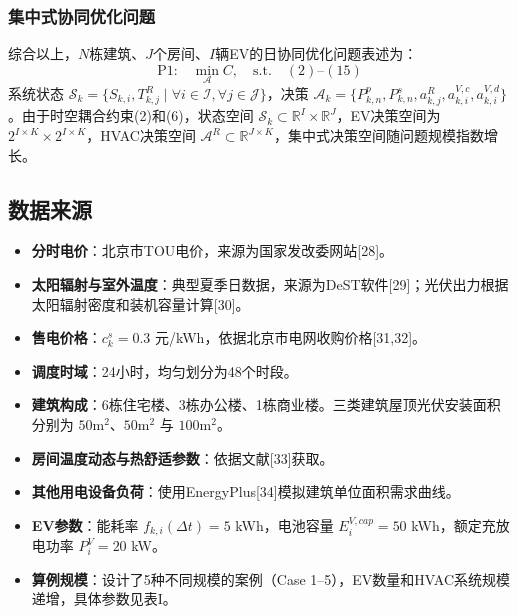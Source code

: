 \documentclass[11pt]{ctexart}
\begin{document}
\subsubsection{集中式协同优化问题}
综合以上，$N$栋建筑、$J$个房间、$I$辆EV的日协同优化问题表述为：
\begin{equation}
    \text{P1:} \quad \min_{\mathcal{A}} C, \quad \text{s.t.} \quad (2)\text{--}(15)
\end{equation}
系统状态 $\mathcal{S}_k = \{S_{k,i}, T_{k,j}^R \mid \forall i \in \mathcal{I}, \forall j \in \mathcal{J}\}$，决策 $\mathcal{A}_k = \{P_{k,n}^p, P_{k,n}^s, a_{k,j}^R, a_{k,i}^{V,c}, a_{k,i}^{V,d}\}$。由于时空耦合约束(2)和(6)，状态空间 $\mathcal{S}_k \subset \mathbb{R}^I \times \mathbb{R}^J$，EV决策空间为 $2^{I \times K} \times 2^{I \times K}$，HVAC决策空间 $\mathcal{A}^R \subset \mathbb{R}^{J \times K}$，集中式决策空间随问题规模指数增长。

\subsection{数据来源}

\begin{itemize}[leftmargin=2em]
    \item \textbf{分时电价}：北京市TOU电价，来源为国家发改委网站[28]。
    \item \textbf{太阳辐射与室外温度}：典型夏季日数据，来源为DeST软件[29]；光伏出力根据太阳辐射密度和装机容量计算[30]。
    \item \textbf{售电价格}：$c_k^s = 0.3$ 元/kWh，依据北京市电网收购价格[31,32]。
    \item \textbf{调度时域}：24小时，均匀划分为48个时段。
    \item \textbf{建筑构成}：6栋住宅楼、3栋办公楼、1栋商业楼。三类建筑屋顶光伏安装面积分别为 $50\text{m}^2$、$50\text{m}^2$ 与 $100\text{m}^2$。
    \item \textbf{房间温度动态与热舒适参数}：依据文献[33]获取。
    \item \textbf{其他用电设备负荷}：使用EnergyPlus[34]模拟建筑单位面积需求曲线。
    \item \textbf{EV参数}：能耗率 $f_{k,i}(\Delta t) = 5$ kWh，电池容量 $E_i^{V,cap} = 50$ kWh，额定充放电功率 $P_i^V = 20$ kW。
    \item \textbf{算例规模}：设计了5种不同规模的案例（Case 1--5），EV数量和HVAC系统规模递增，具体参数见表I。
\end{itemize}
\end{document}
